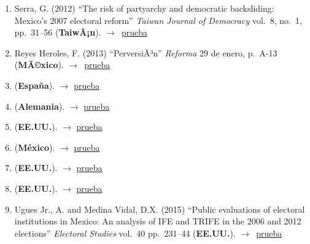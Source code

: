 \documentclass[12 pt, letter]{article}
\newenvironment{CitasMiTrabajo}{
    \begin{footnotesize}
    \begin{enumerate}[label={\footnotesize\emph{cita~\arabic*}},ref=\arabic*] %
        \setlength{\itemsep}{.1\itemsep}
        \setlength{\parskip}{.1\parskip}
    }{\end{enumerate}\end{footnotesize}}
\begin{document}
\begin{CitasMiTrabajo}
        \item Serra, G. (2012)
            ``The risk of partyarchy and democratic backsliding: Mexico's 2007 electoral reform''
            \emph{Taiwan Journal of Democracy}
            vol.\ 8, no.\ 1, pp.\ 31--56 (\textbf{TaiwÃ¡n}). $\rightarrow$~\href{http://ericmagar.com/cv/cites/estevezEtalElecStud/serraElecRefMexico2012tjd.pdf}{prueba}

        \item Reyes Heroles, F. (2013)
            ``PerversiÃ³n''
            \emph{Reforma}
            29 de enero, p.\ A-13 (\textbf{MÃ©xico}). $\rightarrow$~\href{http://ericmagar.com/cv/cites/estevezEtalElecStud/reyesHeroles2013.pdf}{prueba}

        \item {} (\textbf{Espa\~na}).  $\rightarrow$ \href{http://ericmagar.com/cv/cites/estevezEtalElecStud/martinTrife2012amlh.pdf}{prueba}

        \item {} (\textbf{Alemania}).  $\rightarrow$ \href{http://ericmagar.com/cv/cites/estevezEtalElecStud/serraDemiseResurrection2013jpla.pdf}{prueba}

        \item {} (\textbf{EE.UU.}).  $\rightarrow$ \href{http://ericmagar.com/cv/cites/estevezEtalElecStud/diazDominguez2014phd.pdf}{prueba}

        \item {} (\textbf{M\'exico}).  $\rightarrow$ \href{http://ericmagar.com/cv/cites/estevezEtalElecStud/garciaEscon2014phd.pdf}{prueba}

        \item {} (\textbf{EE.UU.}).  $\rightarrow$ \href{http://ericmagar.com/cv/cites/estevezEtalElecStud/resendiz2014.pdf}{prueba}

        \item {} (\textbf{EE.UU.}).  $\rightarrow$ \href{http://ericmagar.com/cv/cites/estevezEtalElecStud/arevalo2015.pdf}{prueba}

        \item Ugues Jr., A. and Medina Vidal, D.X. (2015)
            ``Public evaluations of electoral institutions in Mexico: An analysis of IFE and TRIFE in the 2006 and 2012 elections''
            \emph{Electoral Studies}
            vol.\ 40 pp.\ 231--44 (\textbf{EE.UU.}). $\rightarrow$~\href{http://ericmagar.com/cv/cites/estevezEtalElecStud/ugues.medinaPubEvalElectoralInstitutionsMexico2015es.excerpt.pdf}{prueba}


\end{CitasMiTrabajo}
\end{document}
